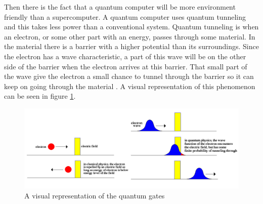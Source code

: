 Then there is the fact that a quantum computer will be more environment friendly than a supercomputer. A quantum computer uses quantum tunneling and this takes less power than a conventional system.
Quantum tunneling is when an electron, or some other part with an energy, passes through some material. In the material there is a barrier with a higher potential than its surroundings.
Since the electron has a wave characteristic, a part of this wave will be on the other side of the barrier when the electron arrives at this barrier.
That small part of the wave give the electron a small chance to tunnel through the barrier so it can keep on going  through the material \autocite{imgtunnel}. A visual representation of this phenomenon can be seen in figure \ref{fig:quantum tunneling}.

\begin{figure} [h]
    \centering
    \includegraphics[width=\textwidth]{img/TunnelingAll.png}
        \caption{A visual representation of the quantum gates \autocite{imgtunnel}}
        \label{fig:quantum tunneling}
\end{figure}